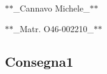 



$\ast$$\ast$\+\_\+\+Cannavo\textquotesingle{} Michele\+\_\+$\ast$$\ast$

$\ast$$\ast$\+\_\+\+Matr. O46-\/002210\+\_\+$\ast$$\ast$





\subsection*{Consegna1}